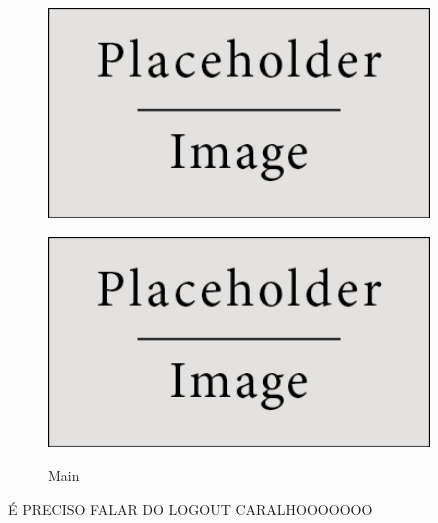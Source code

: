 \documentclass[11pt,twoside,a4paper]{report}
\begin{document}
\begin{figure}[H]
	\centering
	\begin{minipage}{.5\textwidth}
		\begin{center}
			\includegraphics[width=0.9\textwidth]{placeholder} %
			\label{fig:login2}
		\end{center}
	\end{minipage}%
	\begin{minipage}{.5\textwidth}
		\begin{center}
			\includegraphics[width=0.9\textwidth]{placeholder} %
			\label{fig:login3}
		\end{center}
	\end{minipage}
	\caption{Main}
	\label{fig:login1}
\end{figure}
É PRECISO FALAR DO LOGOUT CARALHOOOOOOO
\end{document}
